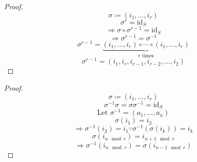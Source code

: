\documentclass{article}
\begin{document}
\begin{proof}
  \[
    \sigma \coloneqq \left( i_1,\ldots,i_r \right) 
  \]
  \[
    \sigma ^r=\text{id}_S 
  \]
  \[
    \Longrightarrow \sigma \circ \sigma^{r-1}=\text{id}_S  
  \]
  \[
    \Longrightarrow \sigma^{r-1}=\sigma ^{-1} 
  \]
  \[
    \sigma^{r-1}=\underbrace{\left( i_1,\ldots,i_r \right)\circ \cdots \circ \left( i_1,\ldots,i_r \right)  }_{r\text{ times} }
  \]
  \[
    \sigma^{r-1}=\left( i_1,i_{r},i_{r-1},i_{r-2},\ldots,i_2    \right)
  \]
\end{proof}
\begin{proof}
  \[
    \sigma \coloneqq \left( i_1,\ldots,i_r \right) 
  \]
  \[
    \sigma ^{-1} \sigma =\sigma \sigma ^{-1} =\text{id}_{S}  
  \]
  \[
    \text{Let }\sigma ^{-1} =(a_1,\ldots,a_n) 
  \]
  \[
    \sigma \left( i_1 \right) =i_2
  \]
  \[
    \Longrightarrow \sigma ^{-1} (i_2)=i_1\because \sigma ^{-1} (\sigma (i_k))=i_k
  \]
\[
  \sigma (i_{n \mod r})=i_{n+1  \mod r} 
\]
\[
  \Longrightarrow \sigma ^{-1} (i_{n \mod r} )=\sigma (i_{n-1 \mod r} )
\]
\end{proof}
\end{document}

